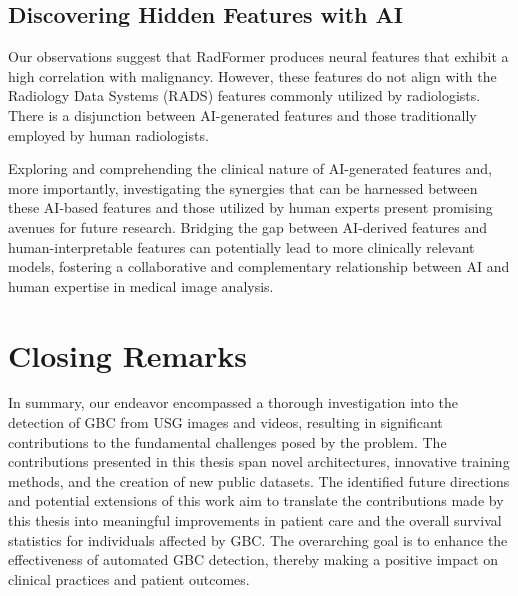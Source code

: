 \subsection{Discovering Hidden Features with AI}
%
Our observations suggest that RadFormer produces neural features that exhibit a high correlation with malignancy. However, these features do not align with the Radiology Data Systems (RADS) features commonly utilized by radiologists. There is a disjunction between AI-generated features and those traditionally employed by human radiologists.

Exploring and comprehending the clinical nature of AI-generated features and, more importantly, investigating the synergies that can be harnessed between these AI-based features and those utilized by human experts present promising avenues for future research. Bridging the gap between AI-derived features and human-interpretable features can potentially lead to more clinically relevant models, fostering a collaborative and complementary relationship between AI and human expertise in medical image analysis.

\par %
\section{Closing Remarks}
%
In summary, our endeavor encompassed a thorough investigation into the detection of GBC from USG images and videos, resulting in significant contributions to the fundamental challenges posed by the problem. The contributions presented in this thesis span novel architectures, innovative training methods, and the creation of new public datasets.
The identified future directions and potential extensions of this work aim to translate the contributions made by this thesis into meaningful improvements in patient care and the overall survival statistics for individuals affected by GBC. The overarching goal is to enhance the effectiveness of automated GBC detection, thereby making a positive impact on clinical practices and patient outcomes.